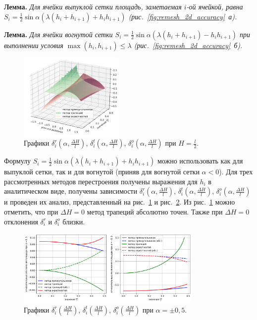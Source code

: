 \documentclass[a4paper,14pt]{extarticle}                     %
\theoremstyle{plain}                                         %
\begin{document}
\textbf{Лемма.} \textit{Для ячейки выпуклой сетки площадь, заметаемая $i$-ой ячейкой, равна $S_i = \frac{1}{2} \sin \alpha \left( \lambda(h_i + h_{i+1}) + h_ih_{i+1} \right)$ (рис.~\ref{fig:remesh_2d_accuracy}~а).}

\textbf{Лемма.} \textit{Для ячейки вогнутой сетки $S_i = \frac{1}{2} \sin \alpha \left( \lambda(h_i + h_{i+1}) - h_ih_{i+1} \right)$ при выполнении условия $\max(h_i, h_{i+1}) \le \lambda$ (рис.~\ref{fig:remesh_2d_accuracy}~б).}

\begin{figure}[ht]
\centering
\includegraphics[width=0.45\textwidth]{pics/text_1_remesh_2d/remesh_3d_chart.png}
\singlespacing
\caption{Графики $\delta_i^r(\alpha, \frac{\Delta H}{l})$, $\delta_i^t(\alpha, \frac{\Delta H}{l})$, $\delta_i^o(\alpha, \frac{\Delta H}{l})$ при $H = \frac{l}{2}$.}
\label{fig:text_1_remesh_3d_main_chart}
\end{figure}

Формулу $S_i = \frac{1}{2} \sin \alpha \left( \lambda(h_i + h_{i+1}) + h_ih_{i+1} \right)$ можно использовать как для выпуклой сетки, так и для вогнутой (приняв для вогнутой сетки $\alpha < 0$).
Для трех рассмотренных методов перестроения получены выражения для $h_i$ в аналитическом виде, получены зависимости $\delta_i^r(\alpha, \frac{\Delta H}{l})$, $\delta_i^t(\alpha, \frac{\Delta H}{l})$, $\delta_i^o(\alpha, \frac{\Delta H}{l})$ и проведен их анализ, представленный на рис.~\ref{fig:text_1_remesh_3d_main_chart} и рис.~\ref{fig:text_1_remesh_fix_alfa_chart}.
Из рис.~\ref{fig:text_1_remesh_3d_main_chart} можно отметить, что при $\Delta H = 0$ метод трапеций абсолютно точен.
Также при $\Delta H = 0$ отклонения $\delta_i^r$ и $\delta_i^o$ близки.

\begin{figure}[ht]
\centering
\includegraphics[width=0.8\textwidth]{pics/text_1_remesh_2d/remesh_fix_alfa_chart.png}
\singlespacing
\caption{Графики $\delta_i^r(\frac{\Delta H}{l})$, $\delta_i^t(\frac{\Delta H}{l})$, $\delta_i^o(\frac{\Delta H}{l})$ при $\alpha = \pm 0,5$.}
\label{fig:text_1_remesh_fix_alfa_chart}
\end{figure}
\end{document}
